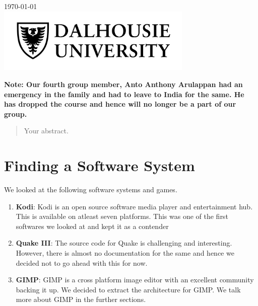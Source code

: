 \begin{titlepage}

{\large \today}\\[2cm] %


\includegraphics[width=0.7\textwidth]{dal.jpg}%
 

\vfill %

\end{titlepage}
\newpage
\textbf{Note: Our fourth group member, Anto Anthony Arulappan had an emergency in the family and had to leave to India for the same. He has dropped the course and hence will no longer be a part of our group.}
\newpage
\tableofcontents
\newpage

\begin{abstract}
Your abstract.
\end{abstract}

\section{Finding a Software System}
We looked at the following software systems and games.
\begin{enumerate}
\item \textbf{Kodi}: Kodi is an open source software media player and entertainment hub. This is available on atleast seven platforms. This was one of the first softwares we looked at and kept it as a contender

\item \textbf{Quake III}: The source code for Quake is challenging and interesting. However, there is almost no documentation for the same and hence we decided not to go ahead with this for now.

\item \textbf{GIMP}: GIMP is a cross platform image editor with an excellent community backing it up. We decided to extract the architecture for GIMP. We talk more about GIMP in the further sections.

\end{enumerate}

